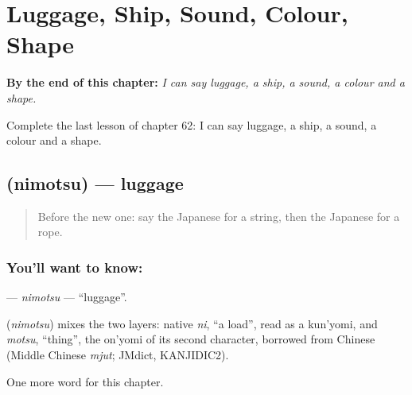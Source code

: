 
\chapter{Luggage, Ship, Sound, Colour, Shape}
\label{ch:ja-luggage-ship-sound-colour-shape}

\begin{chapteropening}
\textbf{By the end of this chapter:} \emph{I can say luggage, a ship, a sound, a colour and a shape.}

Complete the last lesson of chapter 62: I can say luggage, a ship, a sound, a colour and a shape.
\end{chapteropening}

\section[\texorpdfstring{\ja{にもつ} (nimotsu)}{にもつ (nimotsu)}]{ (nimotsu) — luggage}

\label{lesson:JA-C62-nimotsu}



\begin{quote}
Before the new one: say the Japanese for a string, then the Japanese for a rope.
\end{quote}

\subsection*{You'll want to know: }
\textbf{} — \emph{nimotsu} — \textquotedblleft{}luggage\textquotedblright{}.

\begin{cousinweb}
\textbf{} (\emph{nimotsu}) mixes the two layers: native \emph{ni}, \textquotedblleft{}a load\textquotedblright{}, read as a kun'yomi, and \emph{motsu}, \textquotedblleft{}thing\textquotedblright{}, the on'yomi of its second character, borrowed from Chinese (Middle Chinese \emph{mjut}; JMdict, KANJIDIC2).
\end{cousinweb}

\begin{grammarlens}[title={What you've built}]
One more word for this chapter.
\end{grammarlens}

